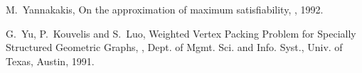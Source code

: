 \begin{thebibliography}{10}
M.~Yannakakis,
\newblock On the approximation of maximum satisfiability,
, 1992.

G.~Yu, P.~Kouvelis and S.~Luo,
\newblock Weighted Vertex Packing Problem for Specially Structured
Geometric Graphs,
, Dept. of Mgmt. Sci. and Info.
Syst., Univ. of Texas, Austin, 1991.

%

\end{thebibliography}




